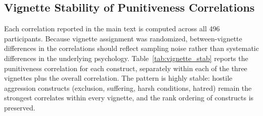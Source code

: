 \subsection{Vignette Stability of Punitiveness Correlations}
\label{sec:supp_vignette_stab}

Each correlation reported in the main text is computed across all 496 participants. Because vignette assignment was randomized, between-vignette differences in the correlations should reflect sampling noise rather than systematic differences in the underlying psychology. Table~\ref{tab:vignette_stab} reports the punitiveness correlation for each construct, separately within each of the three vignettes plus the overall correlation. The pattern is highly stable: hostile aggression constructs (exclusion, suffering, harsh conditions, hatred) remain the strongest correlates within every vignette, and the rank ordering of constructs is preserved.

